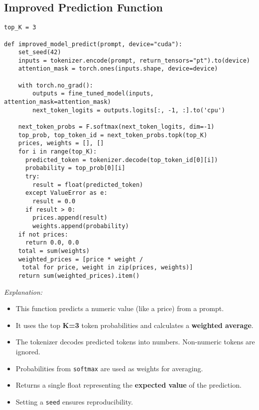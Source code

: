 \documentclass[a4paper, 12pt]{article}
\begin{document}
\subsection*{Improved Prediction Function}
\begin{tcolorbox}[colback=orange!5!white, colframe=orange!80!black, 
                  title=\textbf{Weighted Top-K Prediction}, 
                  coltitle=black, fonttitle=\bfseries, enhanced, sharp corners, boxrule=1pt]

\begin{verbatim}
top_K = 3

def improved_model_predict(prompt, device="cuda"):
    set_seed(42)
    inputs = tokenizer.encode(prompt, return_tensors="pt").to(device)
    attention_mask = torch.ones(inputs.shape, device=device)

    with torch.no_grad():
        outputs = fine_tuned_model(inputs, attention_mask=attention_mask)
        next_token_logits = outputs.logits[:, -1, :].to('cpu')

    next_token_probs = F.softmax(next_token_logits, dim=-1)
    top_prob, top_token_id = next_token_probs.topk(top_K)
    prices, weights = [], []
    for i in range(top_K):
      predicted_token = tokenizer.decode(top_token_id[0][i])
      probability = top_prob[0][i]
      try:
        result = float(predicted_token)
      except ValueError as e:
        result = 0.0
      if result > 0:
        prices.append(result)
        weights.append(probability)
    if not prices:
      return 0.0, 0.0
    total = sum(weights)
    weighted_prices = [price * weight /
     total for price, weight in zip(prices, weights)]
    return sum(weighted_prices).item()
\end{verbatim}

\textit{Explanation:} 
\begin{itemize}
    \item This function predicts a numeric value (like a price) from a prompt.
    \item It uses the top \textbf{K=3} token probabilities and calculates a \textbf{weighted average}.
    \item The tokenizer decodes predicted tokens into numbers. Non-numeric tokens are ignored.
    \item Probabilities from \texttt{softmax} are used as weights for averaging.
    \item Returns a single float representing the \textbf{expected value} of the prediction.
    \item Setting a \texttt{seed} ensures reproducibility.
\end{itemize}

\end{tcolorbox}
\end{document}
